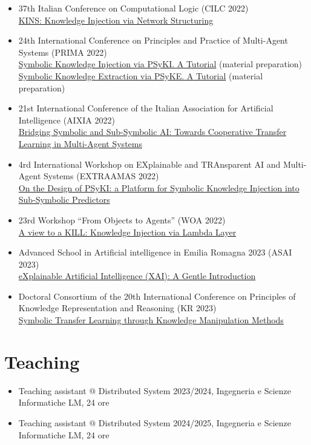 \documentclass[11pt]{article}
\begin{document}
\begin{itemize}
	\item 37th Italian Conference on Computational Logic (CILC 2022)
	\\\href{https://apice.unibo.it/xwiki/bin/view/Talk/KinsCilc2022}{KINS: Knowledge Injection via Network Structuring}
	\item 24th International Conference on Principles and Practice of Multi-Agent Systems (PRIMA 2022)
	\\\href{https://apice.unibo.it/xwiki/bin/view/Talk/PsykitutorialPrima2022}{Symbolic Knowledge Injection via PSyKI. A Tutorial} (material preparation)
	\\\href{https://apice.unibo.it/xwiki/bin/view/Talk/PsykiPrima2022}{Symbolic Knowledge Extraction via PSyKE. A Tutorial} (material preparation)
	\item 21st International Conference of the Italian Association for Artificial Intelligence (AIXIA 2022)
	\\\href{https://apice.unibo.it/xwiki/bin/view/Talk/CtlAixia2022}{Bridging Symbolic and Sub-Symbolic AI: Towards Cooperative Transfer Learning in Multi-Agent Systems}
	\item 4rd International Workshop on EXplainable and TRAnsparent AI and Multi-Agent Systems (EXTRAAMAS 2022)
	\\\href{https://apice.unibo.it/xwiki/bin/view/Talk/PsykiExtraamas2022}{On the Design of PSyKI: a Platform for Symbolic Knowledge Injection into Sub-Symbolic Predictors}
	\item 23rd Workshop ``From Objects to Agents'' (WOA 2022)
	\\\href{https://apice.unibo.it/xwiki/bin/view/Talk/KillWoa2022}{A view to a KILL: Knowledge Injection via Lambda Layer}
	\item Advanced School in Artificial intelligence in Emilia Romagna 2023 (ASAI 2023)
	\\\href{https://apice.unibo.it/xwiki/bin/view/Talk/XaiAsaiErBertinoro2023}{eXplainable Artificial Intelligence (XAI): A Gentle Introduction}
	\item Doctoral Consortium of the 20th International Conference on Principles of Knowledge Representation and Reasoning (KR 2023)
	\\\href{https://apice.unibo.it/xwiki/bin/view/Talk/SymbolicTransferLearning}{Symbolic Transfer Learning through Knowledge Manipulation Methods}
\end{itemize}


\section{Teaching}\label{sec:teaching}
\begin{itemize}
	\item Teaching assistant @ Distributed System 2023/2024, Ingegneria e Scienze Informatiche LM, 24 ore
	\item Teaching assistant @ Distributed System 2024/2025, Ingegneria e Scienze Informatiche LM, 24 ore
\end{itemize}
\end{document}
